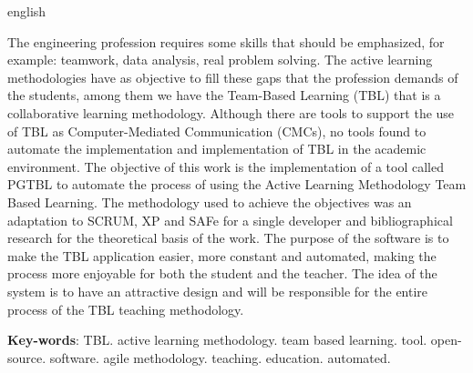 \begin{resumo}[Abstract]
 \begin{otherlanguage*}{english}

   The engineering profession requires some skills that should be emphasized, for example: teamwork, data analysis, real
   problem solving. The active learning methodologies have as objective to fill these gaps that the profession demands
   of the students, among them we have the Team-Based Learning (TBL) that is a collaborative learning methodology.
   Although there are tools to support the use of TBL as Computer-Mediated Communication (CMCs), no tools found to
   automate the implementation and implementation of TBL in the academic environment. The objective of this work is the
   implementation of a tool called PGTBL to automate the process of using the Active Learning Methodology Team Based
   Learning. The methodology used to achieve the objectives was an adaptation to SCRUM, XP and SAFe for a single
   developer and bibliographical research for the theoretical basis of the work. The purpose of the software is to make
   the TBL application easier, more constant and automated, making the process more enjoyable for both the student and
   the teacher. The idea of the system is to have an attractive design and will be responsible for the
   entire process of the TBL teaching methodology.

   \vspace{\onelineskip}

   \noindent
   \textbf{Key-words}: TBL. active learning methodology. team based learning. tool. open-source. software. agile
   methodology. teaching. education. automated.
 \end{otherlanguage*}
\end{resumo}
